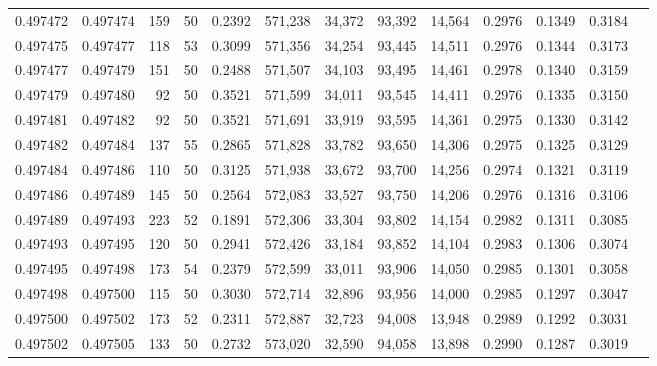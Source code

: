 \begin{tabular}{rrrrrrrrrrrrr}
0.497472 & 0.497474 &   159 &  50 &                                     0.2392 & 571,238 &  34,372 &  93,392 &  14,564 & 0.2976 & 0.1349 & 0.3184 \\
0.497475 & 0.497477 &   118 &  53 &                                     0.3099 & 571,356 &  34,254 &  93,445 &  14,511 & 0.2976 & 0.1344 & 0.3173 \\
0.497477 & 0.497479 &   151 &  50 &                                     0.2488 & 571,507 &  34,103 &  93,495 &  14,461 & 0.2978 & 0.1340 & 0.3159 \\
0.497479 & 0.497480 &    92 &  50 &                                     0.3521 & 571,599 &  34,011 &  93,545 &  14,411 & 0.2976 & 0.1335 & 0.3150 \\
0.497481 & 0.497482 &    92 &  50 &                                     0.3521 & 571,691 &  33,919 &  93,595 &  14,361 & 0.2975 & 0.1330 & 0.3142 \\
0.497482 & 0.497484 &   137 &  55 &                                     0.2865 & 571,828 &  33,782 &  93,650 &  14,306 & 0.2975 & 0.1325 & 0.3129 \\
0.497484 & 0.497486 &   110 &  50 &                                     0.3125 & 571,938 &  33,672 &  93,700 &  14,256 & 0.2974 & 0.1321 & 0.3119 \\
0.497486 & 0.497489 &   145 &  50 &                                     0.2564 & 572,083 &  33,527 &  93,750 &  14,206 & 0.2976 & 0.1316 & 0.3106 \\
0.497489 & 0.497493 &   223 &  52 &                                     0.1891 & 572,306 &  33,304 &  93,802 &  14,154 & 0.2982 & 0.1311 & 0.3085 \\
0.497493 & 0.497495 &   120 &  50 &                                     0.2941 & 572,426 &  33,184 &  93,852 &  14,104 & 0.2983 & 0.1306 & 0.3074 \\
0.497495 & 0.497498 &   173 &  54 &                                     0.2379 & 572,599 &  33,011 &  93,906 &  14,050 & 0.2985 & 0.1301 & 0.3058 \\
0.497498 & 0.497500 &   115 &  50 &                                     0.3030 & 572,714 &  32,896 &  93,956 &  14,000 & 0.2985 & 0.1297 & 0.3047 \\
0.497500 & 0.497502 &   173 &  52 &                                     0.2311 & 572,887 &  32,723 &  94,008 &  13,948 & 0.2989 & 0.1292 & 0.3031 \\
0.497502 & 0.497505 &   133 &  50 &                                     0.2732 & 573,020 &  32,590 &  94,058 &  13,898 & 0.2990 & 0.1287 & 0.3019 \\

\end{tabular}
